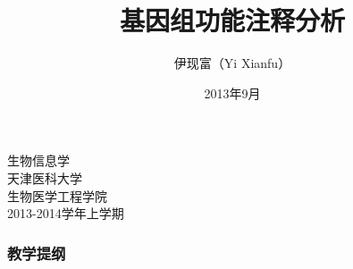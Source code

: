 




\title[基因组功能注释分析]{基因组功能注释分析}
\author[Yixf]{伊现富（Yi Xianfu）}
\date{2013年9月}



\begin{frame}[plain]
	\begin{center}
		{\Huge 生物信息学\\}
		\vspace{1cm}
		{\LARGE 天津医科大学\\}
		{\LARGE 生物医学工程学院\\}
		\vspace{1cm}
		{\large 2013-2014学年上学期}
	\end{center}
\end{frame}

\begin{frame}
  \titlepage
\end{frame}

\begin{frame}[plain]
  \frametitle{教学提纲}
  \setcounter{tocdepth}{2}
  \begin{multicols}{2}
  \tableofcontents
  \end{multicols}
\end{frame}

